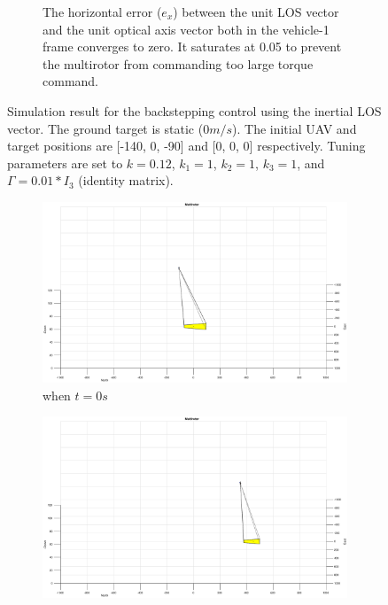 \begin{figure}[htbp]
\begin{subfigure}[t]{0.8\linewidth}
		\caption{The horizontal error ($e_x$) between the unit LOS vector and the unit optical axis vector both in the vehicle-1 frame converges to zero. It saturates at 0.05 to prevent the multirotor from commanding too large torque command.}
	\end{subfigure}	
	\caption{Simulation result for the backstepping control using the inertial LOS vector. The ground target is static ($0m/s$). The initial UAV and target positions are [-140, 0, -90] and [0, 0, 0] respectively. Tuning parameters are set to $k=0.12$, $k_1=1$, $k_2=1$, $k_3=1$, and $\Gamma=0.01*I_3$ (identity matrix).}
	\label{inertial_0mps}
\end{figure}

\begin{figure}[htbp]
	\centering
	\begin{subfigure}[t]{0.32\linewidth}
		\includegraphics[width=\textwidth]{images/chapter4/inertial_UAV_5mps}
		\caption{when $t=0s$}
	\end{subfigure}
	\begin{subfigure}[t]{0.32\linewidth}
		\includegraphics[width=\textwidth]{images/chapter4/inertial_UAV_5mps_90s}

\end{subfigure}
\end{figure}
